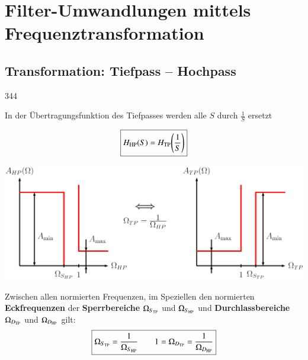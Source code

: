 


\section{Filter-Umwandlungen mittels Frequenztransformation}
\label{Frequenztransformation}

\subsection{Transformation: Tiefpass -- Hochpass}{344}

In der Übertragungsfunktion des Tiefpasses werden alle $S$ durch $\frac{1}{S}$ ersetzt

\begin{minipage}[c]{0.4\columnwidth}
    $$ \boxed{H_{\rm HP}(S) = H_{\rm TP} \Bigg(\frac{1}{S} \Bigg) } $$
\end{minipage}
\hfill
\begin{minipage}[c]{0.58\columnwidth}
    \includegraphics[width=\columnwidth]{images/toleranzschema_HP_TP.png}
\end{minipage}

\vspace{0.2cm}
Zwischen allen normierten Frequenzen, im Speziellen den normierten \textbf{Eckfrequenzen} der \textbf{Sperrbereiche}
$\Omega_{S_{\rm TP}}$ und $\Omega_{S_{\rm HP}}$ und \textbf{Durchlassbereiche} $\Omega_{D_{\rm TP}}$ und $\Omega_{D_{\rm HP}}$ gilt:
$$ \boxed{ \Omega_{S_{\rm TP}} = \frac{1}{\Omega_{S_{\rm HP}}}  \qquad 1 = \Omega_{D_{\rm TP}} = \frac{1}{\Omega_{D_{\rm HP}}} } $$


